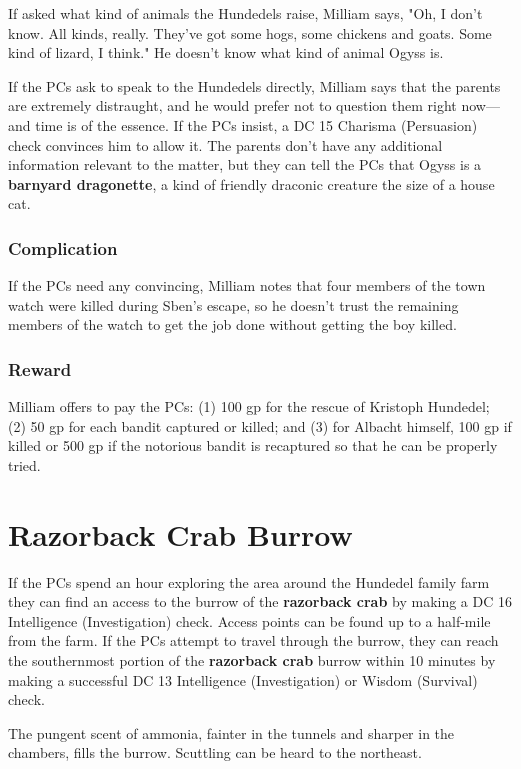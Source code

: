 \documentclass[10pt,a4paper,twoside,bg=print,twocolumn,openany,nodeprecatedcode]{dndbook}
\begin{document}
If asked what kind of animals the Hundedels raise, Milliam says, "Oh, I don't know. All kinds, really. They've got some hogs, some chickens and goats. Some kind of lizard, I think." He doesn't know what kind of animal Ogyss is.

If the PCs ask to speak to the Hundedels directly, Milliam says that the parents are extremely distraught, and he would prefer not to question them right now—and time is of the essence. If the PCs insist, a DC 15 Charisma (Persuasion) check convinces him to allow it. The parents don't have any additional information relevant to the matter, but they can tell the PCs that Ogyss is a \textbf{barnyard dragonette}, a kind of friendly draconic creature the size of a house cat.

\subsubsection{Complication}
If the PCs need any convincing, Milliam notes that four members of the town watch were killed during Sben's escape, so he doesn't trust the remaining members of the watch to get the job done without getting the boy killed.

\subsubsection{Reward}
Milliam offers to pay the PCs: (1) 100 gp for the rescue of Kristoph Hundedel; (2) 50 gp for each bandit captured or killed; and (3) for Albacht himself, 100 gp if killed or 500 gp if the notorious bandit is recaptured so that he can be properly tried.

\section{Razorback Crab Burrow}
If the PCs spend an hour exploring the area around the Hundedel family farm they can find an access to the burrow of the \textbf{razorback crab} by making a DC 16 Intelligence (Investigation) check. Access points can be found up to a half-mile from the farm. If the PCs attempt to travel through the burrow, they can reach the southernmost portion of the \textbf{razorback crab} burrow within 10 minutes by making a successful DC 13 Intelligence (Investigation) or Wisdom (Survival) check.

The pungent scent of ammonia, fainter in the tunnels and sharper in the chambers, fills the burrow. Scuttling can be heard to the northeast.
\end{document}
